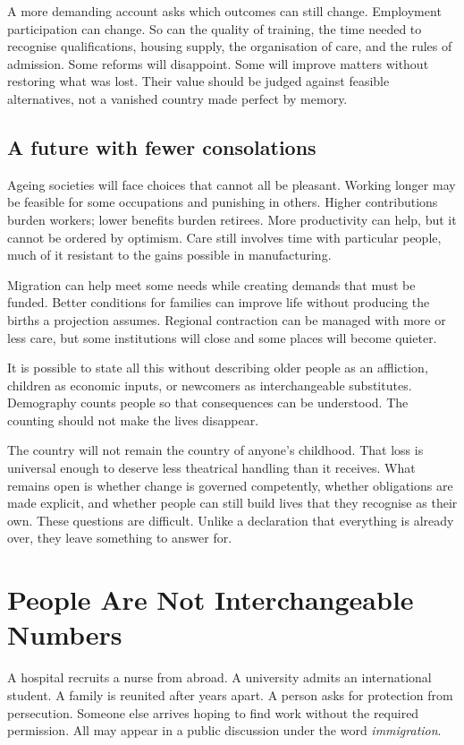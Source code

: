 \documentclass[12pt,a4paper]{book}
\begin{document}
A more demanding account asks which outcomes can still change. Employment participation can change. So can the quality of training, the time needed to recognise qualifications, housing supply, the organisation of care, and the rules of admission. Some reforms will disappoint. Some will improve matters without restoring what was lost. Their value should be judged against feasible alternatives, not a vanished country made perfect by memory.

\section*{A future with fewer consolations}

Ageing societies will face choices that cannot all be pleasant. Working longer may be feasible for some occupations and punishing in others. Higher contributions burden workers; lower benefits burden retirees. More productivity can help, but it cannot be ordered by optimism. Care still involves time with particular people, much of it resistant to the gains possible in manufacturing.

Migration can help meet some needs while creating demands that must be funded. Better conditions for families can improve life without producing the births a projection assumes. Regional contraction can be managed with more or less care, but some institutions will close and some places will become quieter.

It is possible to state all this without describing older people as an affliction, children as economic inputs, or newcomers as interchangeable substitutes. Demography counts people so that consequences can be understood. The counting should not make the lives disappear.

The country will not remain the country of anyone's childhood. That loss is universal enough to deserve less theatrical handling than it receives. What remains open is whether change is governed competently, whether obligations are made explicit, and whether people can still build lives that they recognise as their own. These questions are difficult. Unlike a declaration that everything is already over, they leave something to answer for.

\chapter{People Are Not Interchangeable Numbers}

A hospital recruits a nurse from abroad. A university admits an international student. A family is reunited after years apart. A person asks for protection from persecution. Someone else arrives hoping to find work without the required permission. All may appear in a public discussion under the word \emph{immigration}.
\end{document}
